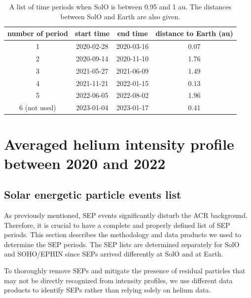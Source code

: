 \begin{table}[!htb]
    \centering
	\caption[Time periods when \ac{SolO} closed to 1 au]{A list of time periods when \ac{SolO} is between 0.95 and 1 au. The distances between \ac{SolO} and Earth are also given.}
	\label{tab:1AU_period}
    \begin{tabular}{|c|c|c|c|}
    \hline
	number of period & start time & end time & distance to Earth  (au)\\
    \hline
    1   & 2020-02-28 & 2020-03-16   & 0.07 \\
    \hline
	2	& 2020-09-14 & 2020-11-10	& 1.76 \\
    \hline
	3	& 2021-05-27 & 2021-06-09	& 1.49 \\
    \hline
	4	& 2021-11-21 & 2022-01-15	& 0.13 \\
    \hline
	5	& 2022-06-05 & 2022-08-02	& 1.96 \\
    \hline
    6 (not used)	& 2023-01-04 & 2023-01-17	& 0.41 \\
    \hline
    \end{tabular}
\end{table}

\section{Averaged helium intensity profile between 2020 and 2022}
\subsection*{Solar energetic particle events list}

As previously mentioned, \ac{SEP} events significantly disturb the \ac{ACR} background. Therefore, it is crucial to have a complete and properly defined list of \ac{SEP} periods. This section describes the methodology and data products we used to determine the \ac{SEP} periods. The \ac{SEP} lists are determined separately for \ac{SolO} and \ac{SOHO}/\ac{EPHIN} since \acp{SEP} arrived differently at \ac{SolO} and at Earth. 

To thoroughly remove \acp{SEP} and mitigate the presence of residual particles that may not be directly recognized from intensity profiles, we use different data products to identify \acp{SEP} rather than relying solely on helium data.


